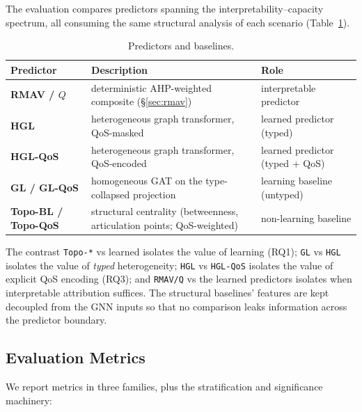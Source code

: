 \documentclass[review]{elsarticle}
\begin{document}
The evaluation compares predictors spanning the interpretability--capacity spectrum, all consuming
the same structural analysis of each scenario (Table~\ref{tab:predictors}).

\begin{table}[h]
\centering
\caption{Predictors and baselines.}
\label{tab:predictors}
\begin{tabular}{@{}p{2.6cm}p{5.4cm}p{3.6cm}@{}}
\toprule
Predictor & Description & Role \\
\midrule
\textbf{RMAV / $Q$} & deterministic AHP-weighted composite (\S\ref{sec:rmav}) & interpretable predictor \\
\textbf{HGL} & heterogeneous graph transformer, QoS-masked & learned predictor (typed) \\
\textbf{HGL-QoS} & heterogeneous graph transformer, QoS-encoded & learned predictor (typed + QoS) \\
\textbf{GL / GL-QoS} & homogeneous GAT on the type-collapsed projection & learning baseline (untyped) \\
\textbf{Topo-BL / Topo-QoS} & structural centrality (betweenness, articulation points; QoS-weighted) & non-learning baseline \\
\bottomrule
\end{tabular}
\end{table}

The contrast \texttt{Topo-*} vs learned isolates the value of learning (RQ1); \texttt{GL} vs
\texttt{HGL} isolates the value of \emph{typed} heterogeneity; \texttt{HGL} vs \texttt{HGL-QoS}
isolates the value of explicit QoS encoding (RQ3); and \texttt{RMAV/Q} vs the learned predictors
isolates when interpretable attribution suffices. The structural baselines' features are kept
decoupled from the GNN inputs so that no comparison leaks information across the predictor boundary.

\subsection{Evaluation Metrics}

We report metrics in three families, plus the stratification and significance machinery:
\end{document}
